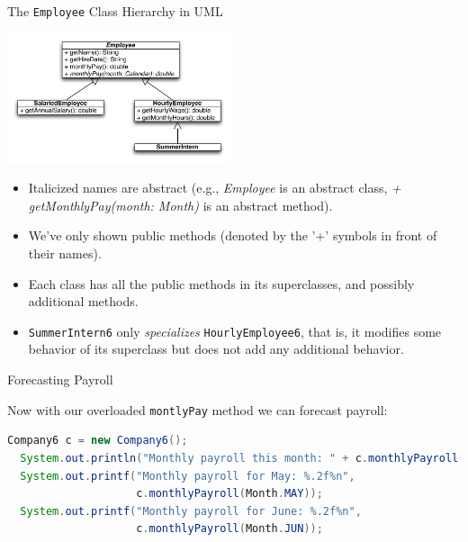 \documentclass{beamer}
\begin{document}
\begin{frame}[fragile]{The {\tt Employee} Class Hierarchy in UML}


\vspace{-.2in}
\begin{center}
\includegraphics[height=1.5in]{employee-uml.pdf}
\end{center}
\vspace{-.25in}
\begin{itemize}
\item Italicized names are abstract (e.g., {\it Employee} is an abstract class, {\it + getMonthlyPay(month: Month)} is an abstract method).
\item We've only shown public methods (denoted by the '+' symbols in front of their names).
\item Each class has all the public methods in its superclasses, and possibly additional methods.
\item {\tt SummerIntern6} only {\it specializes} {\tt HourlyEmployee6}, that is, it modifies some behavior of its superclass but does not add any additional behavior. 
\end{itemize}


\end{frame}

\begin{frame}[fragile]{Forecasting Payroll}


Now with our overloaded  {\tt montlyPay} method we can forecast payroll:
\begin{lstlisting}[language=Java]
  Company6 c = new Company6();
  System.out.println("Monthly payroll this month: " + c.monthlyPayroll());
  System.out.printf("Monthly payroll for May: %.2f%n",
                    c.monthlyPayroll(Month.MAY));
  System.out.printf("Monthly payroll for June: %.2f%n",
                    c.monthlyPayroll(Month.JUN));
\end{lstlisting}


\end{frame}
\end{document}
